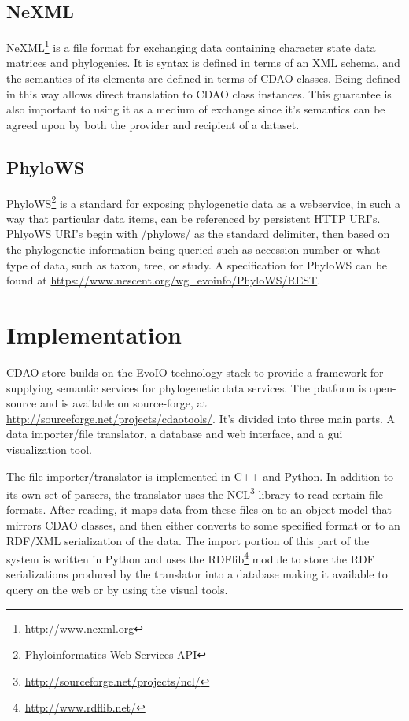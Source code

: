 \documentclass[10pt]{bmc_article}
\newenvironment{bmcformat}{\begin{raggedright}\baselineskip20pt\sloppy\setboolean{publ}{false}}{\end{raggedright}\baselineskip20pt\sloppy}
\begin{document}
\begin{bmcformat}
\subsection*{NeXML}
  NeXML\footnote{\url{http://www.nexml.org}} is a file format for exchanging data containing character state data
  matrices and phylogenies. It is syntax is defined in terms of an XML schema, and the semantics of its elements
  are defined in terms of CDAO classes. Being defined in this way allows direct translation to CDAO class instances.
  This guarantee is also important to using it as a medium of exchange since it's semantics can be agreed upon by
  both the provider and recipient of a dataset.

\subsection*{PhyloWS}
  PhyloWS\footnote{Phyloinformatics Web Services API} is a standard for exposing phylogenetic data as a webservice, in such a way that particular data items,
  can be referenced by persistent HTTP URI's.  PhlyoWS URI's begin with /phylows/ as the standard delimiter, then based on the phylogenetic information being queried such as accession number or what type of data, such as taxon, tree, or study.  A specification for PhyloWS can be found at \url{https://www.nescent.org/wg_evoinfo/PhyloWS/REST}.

\section*{Implementation}

CDAO-store builds on the EvoIO technology stack to provide a framework for supplying semantic services
for phylogenetic data services. The platform is open-source and is available on source-forge, at
\url{http://sourceforge.net/projects/cdaotools/}. It's divided into three main parts. A data importer/file translator,
a database and web interface, and a gui visualization tool. 

The file importer/translator is implemented in C++ and Python. In addition to its own set of parsers, 
the translator uses the NCL\footnote{\url{http://sourceforge.net/projects/ncl/}} library to read certain file formats.
After reading, it maps data from these files on to an object model that mirrors CDAO classes, and then either converts
to some specified format or to an RDF/XML serialization of the data. The import portion of this part of the system is
written in Python and uses the RDFlib\footnote{\url{http://www.rdflib.net/}} module to store the RDF serializations 
produced by the translator into a database making it available to query on the web or by using the visual tools.


\end{bmcformat}
\end{document}
